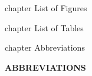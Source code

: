 \documentclass[12pt,a4paper]{report}
\begin{document}
	
	\begin{center}
	

		\setlength{\cftbeforetoctitleskip}{0pt}

		\renewcommand{\contentsname}{\fontsize{16pt}{1.5pt}\selectfont\bfseries\textbf{TABLE OF CONTENTS} \fontfamily{times}}
		\setlength{\cftaftertoctitleskip}{2pt}
		\tableofcontents
	\end{center}
	
	
	
	
	
	
	\pagebreak
	
	
	
	 {chapter} {List of Figures}
	\thispagestyle{plain}

		\setlength{\cftbeforeloftitleskip}{0pt}

		\renewcommand{\listfigurename}{\fontsize{16}{1.5}\selectfont\bfseries\textbf{List of Figures}}
			\setlength{\cftafterloftitleskip}{1.5pt}
		\listoffigures 
	
	
	\pagebreak
	 {chapter} {List of Tables}
	\thispagestyle{plain}
		\setlength{\cftbeforelottitleskip}{0pt}
	\renewcommand{\listtablename}{\fontsize{16}{1.5}\selectfont\bfseries\textbf{List of Tables}}
	\setlength{\cftafterlottitleskip}{1.5pt}
	
	\renewcommand{\cfttabpresnum}{Table\space}
		\listoftables

	
	
	
	\pagebreak
	 {chapter} {Abbreviations}
	\thispagestyle{plain}
	\begin{FlushLeft}
	    
		\textbf	{\Large {ABBREVIATIONS} \\}
	\end{FlushLeft}
		
\end{document}
